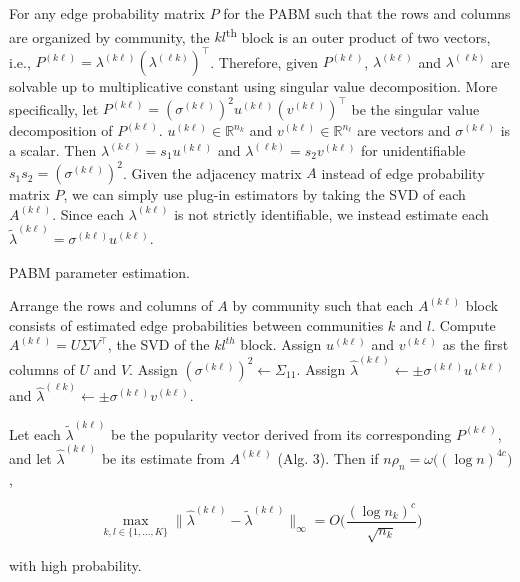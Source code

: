 \documentclass[12pt]{article}
\begin{document}
For any edge probability matrix \(P\) for the PABM such that the rows
and columns are organized by community, the \(kl\)\textsuperscript{th}
block is an outer product of two vectors, i.e.,
\(P^{(k \ell)} = \lambda^{(k \ell)} (\lambda^{(\ell k)})^\top\). Therefore, given
\(P^{(k \ell)}\), \(\lambda^{(k \ell)}\) and \(\lambda^{(\ell k)}\) are solvable
up to multiplicative constant using singular value
decomposition. More specifically, 
let \(P^{(k \ell)} = (\sigma^{(k \ell)})^2 u^{(k \ell)} (v^{(k \ell)})^\top\)
be the singular value decomposition of \(P^{(k \ell)}\).
\(u^{(k \ell)} \in \mathbb{R}^{n_k}\) and 
\(v^{(k \ell)} \in \mathbb{R}^{n_\ell}\) are vectors
and \(\sigma^{(k \ell)}\) is a scalar. 
Then \(\lambda^{(k \ell)} = s_1 u^{(k \ell)}\)
and \(\lambda^{(\ell k)} = s_2 v^{(k \ell)}\) 
for unidentifiable $s_1 s_2 = (\sigma^{(k \ell)})^2$.
Given the adjacency matrix \(A\)
instead of edge probability matrix \(P\), we can simply use plug-in
estimators by taking the SVD of each $A^{(k \ell)}$. 
Since each $\lambda^{(k \ell)}$ is not strictly identifiable,
we instead estimate each $\tilde{\lambda}^{(k \ell)} = \sigma^{(k \ell)} u^{(k \ell)}$. 

\begin{algorithm}[t]
  \DontPrintSemicolon
  \SetAlgoLined
  \caption{PABM parameter estimation.}
  Arrange the rows and columns of $A$ by community such that each 
  $A^{(k \ell)}$ block consists of estimated edge probabilities between 
  communities $k$ and $l$.\;
   {
    Compute $A^{(k \ell)} = U \Sigma V^\top$, the SVD of the $kl^{th}$ 
    block.\;
    Assign $u^{(k \ell)}$ and $v^{(k \ell)}$ as the first columns of $U$ and $V$. 
    Assign $(\sigma^{(k \ell)})^2 \leftarrow \Sigma_{11}$.\;
    Assign $\hat{\lambda}^{(k \ell)} \leftarrow \pm \sigma^{(k \ell)} u^{(k \ell)}$ and 
    $\hat{\lambda}^{(\ell k)} \leftarrow \pm \sigma^{(k \ell)} v^{(k \ell)}$.
  }
\end{algorithm}

\begin{theorem}
\label{theorem6}
Let each $\tilde{\lambda}^{(k \ell)}$ be the popularity vector derived from its corresponding $P^{(k \ell)}$, and let $\hat{\lambda}^{(k \ell)}$ be its estimate from $A^{(k \ell)}$ (Alg. 3). Then if $n \rho_n = \omega \big( (\log n)^{4 c} \big)$,

\begin{equation} \label{eq:thm6}
\max_{k, l \in \{1, ..., K\}} 
\|\hat{\lambda}^{(k \ell)} - \tilde{\lambda}^{(k \ell)}\|_{\infty} = 
O\bigg(\frac{(\log n_k)^c}{\sqrt{n_k}} \bigg)
\end{equation}

with high probability.
\end{theorem}
\end{document}
